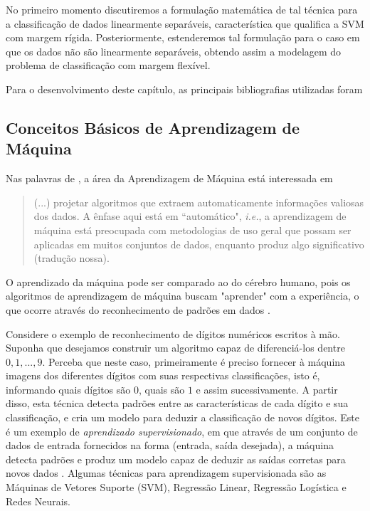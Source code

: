 \documentclass[12pt,a4paper]{scrartcl}
\theoremstyle{definition}%
\begin{document}
No primeiro momento discutiremos a formulação matemática de tal técnica para a classificação de dados linearmente separáveis, característica que qualifica a SVM com margem rígida. Posteriormente, estenderemos tal formulação para o caso em que os dados não são linearmente separáveis, obtendo assim a modelagem do problema de classificação com margem flexível.

Para o desenvolvimento deste capítulo, as principais bibliografias utilizadas foram \textcite{Faisal2019,Evelin2017}


\subsection{Conceitos Básicos de Aprendizagem de Máquina}

Nas palavras de \textcite[p. 11]{Faisal2019}, a área da Aprendizagem de Máquina está interessada em 
\begin{quote}
(...) projetar algoritmos que extraem automaticamente informações valiosas dos dados. A ênfase aqui está em ``automático", \emph{i.e.}, a aprendizagem de máquina está preocupada com metodologias de uso geral que possam ser aplicadas em muitos conjuntos de dados, enquanto produz algo significativo (tradução nossa). 
\end{quote}
O aprendizado da máquina pode ser comparado ao do cérebro humano, pois os algoritmos de aprendizagem de máquina buscam "aprender" com a experiência, o que ocorre através do reconhecimento de padrões em dados \cite{Evelin2017}. 

Considere o exemplo de reconhecimento de dígitos numéricos escritos à mão. Suponha que desejamos construir um algoritmo capaz de diferenciá-los dentre $0, 1, ...,9$. Perceba que neste caso, primeiramente é preciso fornecer à máquina imagens dos diferentes dígitos com suas respectivas classificações, isto é, informando quais dígitos são $0$, quais são $1$ e assim sucessivamente. A partir disso, esta técnica detecta padrões entre as características de cada dígito e sua classificação, e cria um modelo para deduzir a classificação de novos dígitos. Este é um exemplo de \emph{aprendizado supervisionado}, em que através de um conjunto de dados de entrada fornecidos na forma (entrada, saída desejada), a máquina detecta padrões e produz um modelo capaz de deduzir as saídas corretas para novos dados \cite{Lorena&Carvalho}. Algumas técnicas para aprendizagem supervisionada são as Máquinas de Vetores Suporte (SVM), Regressão Linear, Regressão Logística e Redes Neurais.
\end{document}
